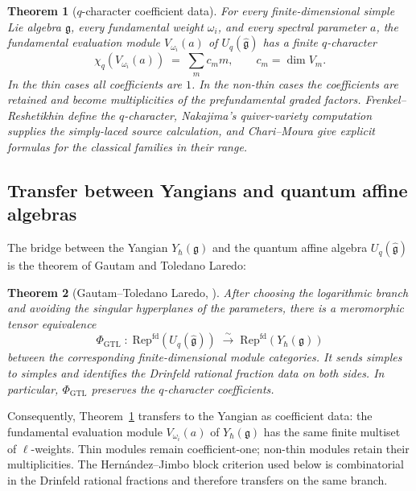\documentclass[11pt,reqno]{amsart}
\newtheorem{theorem}{Theorem}[section]
\theoremstyle{definition}
\theoremstyle{remark}
\newcommand{\fg}{\mathfrak{g}}
\newcommand{\Rep}{\mathrm{Rep}}
\newcommand{\Yh}{Y_\hbar(\fg)}
\newcommand{\Uq}{U_q(\hat{\fg})}
\numberwithin{equation}{section}
\begin{document}
\begin{theorem}[$q$-character coefficient data]
\label{thm:chari-moura}
For every finite-dimensional simple Lie algebra $\fg$, every
fundamental weight $\omega_i$, and every spectral parameter $a$,
the fundamental evaluation module $V_{\omega_i}(a)$ of $\Uq$ has a
finite $q$-character
\[
\chi_q(V_{\omega_i}(a))
 \;=\;
 \sum_m c_m m,
 \qquad
 c_m=\dim V_m .
\]
In the thin cases all coefficients are $1$. In the non-thin cases
the coefficients are retained and become multiplicities of the
prefundamental graded factors. Frenkel--Reshetikhin
\cite{FR99} define the $q$-character, Nakajima's
quiver-variety computation~\cite{Nakajima04} supplies the
simply-laced source calculation, and Chari--Moura
\cite{ChariMoura06} give explicit formulas for the classical
families in their range.
\end{theorem}

\subsection{Transfer between Yangians and quantum affine algebras}

The bridge between the Yangian $\Yh$ and the quantum affine algebra
$\Uq$ is the theorem of Gautam and Toledano Laredo:

\begin{theorem}[Gautam--Toledano Laredo, \cite{GTL17}]
\label{thm:gtl}
After choosing the logarithmic branch and avoiding the singular
hyperplanes of the parameters, there is a meromorphic tensor
equivalence
\[
\Phi_{\mathrm{GTL}} \;:\;
\Rep^{\mathrm{fd}}(\Uq) \;\xrightarrow{\;\sim\;}\;
\Rep^{\mathrm{fd}}(\Yh)
\]
between the corresponding finite-dimensional module categories.
It sends simples to simples and identifies the Drinfeld rational
fraction data on both sides. In particular,
$\Phi_{\mathrm{GTL}}$ preserves the $q$-character coefficients.
\end{theorem}

Consequently, Theorem~\ref{thm:chari-moura} transfers to the
Yangian as coefficient data: the fundamental evaluation module
$V_{\omega_i}(a)$ of $\Yh$ has the same finite multiset of
$\ell$-weights. Thin modules remain coefficient-one; non-thin
modules retain their multiplicities. The Hern\'andez--Jimbo block
criterion used below is combinatorial in the Drinfeld rational
fractions and therefore transfers on the same branch.

\end{document}
